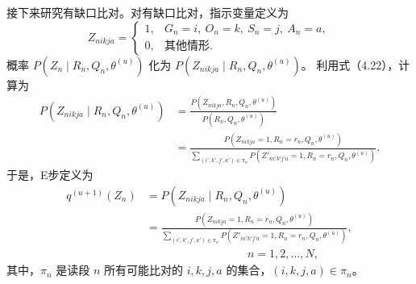 接下来研究有缺口比对。对有缺口比对，指示变量定义为
\begin{equation}
Z_{nikja}=\begin{cases}
1,&G_n=i,\ O_n=k,\ S_n=j,\ A_n=a,\\0,&\text{其他情形}.
\end{cases}\tag{4.A.34}
\end{equation}
概率 $P(Z_n\mid R_n,Q_n,\theta^{(u)})$ 化为 $P(Z_{nikja}\mid R_n,Q_n,\theta^{(u)})$。
利用式（4.22），计算为
\[
\begin{aligned}
P(Z_{nikja}\mid R_n,Q_n,\theta^{(u)})
&=\frac{P(Z_{nikja},R_n,Q_n,\theta^{(u)})}{P(R_n,Q_n,\theta^{(u)})}\\
&=\frac{P(Z_{nikja}=1,R_n=r_n,Q_n,\theta^{(u)})}{
\sum_{(i',k',j',a')\in\pi_n}P(Z'_{ni'k'j'a}=1,R_n=r_n,Q_n,\theta^{(u)})}.
\end{aligned}
\]
于是，E步定义为
\begin{equation}
\begin{aligned}
q^{(u+1)}(Z_n)&=P(Z_{nikja}\mid R_n,Q_n,\theta^{(u)})\\
&=\frac{P(Z_{nikja}=1,R_n=r_n,Q_n,\theta^{(u)})}{
\sum_{(i',k',j',a')\in\pi_n}P(Z'_{ni'k'j'a}=1,R_n=r_n,Q_n,\theta^{(u)})},\\
&\hspace{9em}n=1,2,\ldots,N,
\end{aligned}\tag{4.A35}
\end{equation}
其中，$\pi_n$ 是读段 $n$ 所有可能比对的 $i,k,j,a$ 的集合，$(i,k,j,a)\in\pi_n$。

